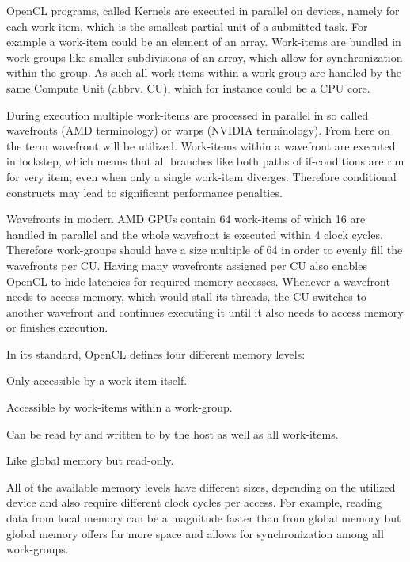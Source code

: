 \begin{description}[style=nextline]
    \item [Programming Model]
    OpenCL programs, called Kernels are executed in parallel on devices, namely for each work-item, which is the smallest partial unit of a submitted task. For example a work-item could be an element of an array. Work-items are bundled in work-groups like smaller subdivisions of an array, which allow for synchronization within the group. As such all work-items within a work-group are handled by the same Compute Unit (abbrv. CU), which for instance could be a CPU core.

    During execution multiple work-items are processed in parallel in so called wavefronts (AMD terminology) or warps (NVIDIA terminology). From here on the term wavefront will be utilized. Work-items within a wavefront are executed in lockstep, which means that all branches like both paths of if-conditions are run for very item, even when only a single work-item diverges. Therefore conditional constructs may lead to significant performance penalties.

    Wavefronts in modern AMD GPUs contain 64 work-items of which 16 are handled in parallel and the whole wavefront is executed within 4 clock cycles. Therefore work-groups should have a size multiple of 64 in order to evenly fill the wavefronts per CU. Having many wavefronts assigned per CU also enables OpenCL to hide latencies for required memory accesses. Whenever a wavefront needs to access memory, which would stall its threads, the CU switches to another wavefront and continues executing it until it also needs to access memory or finishes execution.

    \item [Memory Model]
    In its standard, OpenCL defines four different memory levels:
    \begin{description}[align=left]
      \item [private] Only accessible by a work-item itself.
      \item [local] Accessible by work-items within a work-group.
      \item [global] Can be read by and written to by the host as well as all work-items.
      \item [constant] Like global memory but read-only.
    \end{description}

    All of the available memory levels have different sizes, depending on the utilized device and also require different clock cycles per access. For example, reading data from local memory can be a magnitude faster than from global memory but global memory offers far more space and allows for synchronization among all work-groups.

\end{description}

